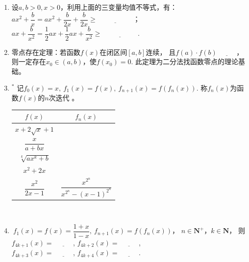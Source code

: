 \documentclass{article}
\newif\ifte
\renewcommand\geq\geqslant
\begin{document}
\begin{multicols}{2}
\begin{enumerate}[leftmargin=20pt]
\item 设$ a,b>0,x>0 $，利用上面的三变量均值不等式，有：\\
$ ax^2+\dfrac{b}{x}=ax^2+\dfrac{b}{2x}+\dfrac{b}{2x}\geq 
\underline{\ \ifte 3 \sqrt[3]{\dfrac{ab^2}{4}}\else \hspace{2cm} \fi\ } $；\\
$ ax+\dfrac{b}{x^2}=\dfrac{1}{2}ax+\dfrac{1}{2}ax+\dfrac{b}{x^2} \geq 
\underline{\ \ifte 3 \sqrt[3]{\dfrac{a^2b}{4}}\else \hspace{2cm} \fi\ } $.

\item 零点存在定理：若函数$ f(x) $在闭区间$ [a,b] $连续，
且$ f(a)\cdot f(b)\underline{\ \ifte <0\else \hspace{1cm} \fi\ } $，
则一定存在$ x_0\in(a,b) $，使$ f(x_0)=0 $.
此定理为二分法找函数零点的理论基础。

\item $^*$ 记$ f_0(x)=x,\ f_1(x)=f(x),\ f_{n+1}(x)=f(f_n(x)) $. 
称$ f_n(x) $为函数$ f(x) $的$ n $次迭代 \ifte 
(用数学归纳法证明) \fi。
\renewcommand\arraystretch{1.5} 
\\  
\begin{tabular}{|c|c|} 
    \hline
    $ f(x) $ & $ f_n(x) $ \\
    \hline
    $ x+2\sqrt{x}+1 $ & \ifte $ (\sqrt{x}+n)^2 $\else \hspace{3cm}  \fi \\
    \hline
    $ \dfrac{x}{a+bx} $ & \ifte $ \dfrac{x}{a^n+\dfrac{1-a^n}{1-a}bx} $ \fi \\
    \hline
    $ \sqrt[k]{ax^k+b} $ & \ifte $ \sqrt[k]{a^nx^k+\dfrac{1-a^n}{1-a}b} $ \fi \\
    \hline
    $ x^2+2x $ & \ifte $ (x+1)^{2^n}-1 $ \fi \\
    \hline
    $ \dfrac{x^2}{2x-1} $ & $\dfrac{x^{2^n}}{x^{2^n}-(x-1)^{2^n}}$ \\
    \hline
\end{tabular} \\

\item $\ f_1(x)=f(x)=\dfrac{1+x}{1-x},\ f_{n+1}(x)=f(f_n(x)) $，
$ n\in \textbf{N}^+ $，$ k\in \textbf{N} $，
则 $ f_{4k+1}(x)=\underline{\ \ifte 
\dfrac{1+x}{1-x} \else \hspace{1cm} \fi\ } $,
$ f_{4k+2}(x)=\underline{\ \ifte -\dfrac{1}{x}
\else \hspace{1cm} \fi\ } $, \\ $ f_{4k+3}(x)=\underline{\ \ifte 
\dfrac{x-1}{x+1} \else \hspace{1cm} \fi\ } $,
$ f_{4k+4}(x)=\underline{\ \ifte x\else \hspace{1cm} \fi\ } $.



\end{enumerate}
\end{multicols}
\end{document}
